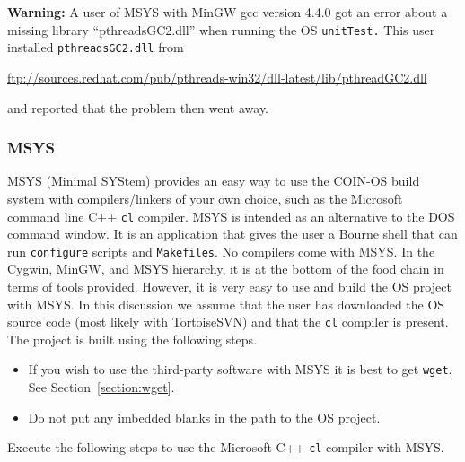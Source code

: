 \documentclass[11pt]{article}
\renewcommand{\_}{{\char"5F}}
\renewcommand{\{}{{\char"7B}}
\renewcommand{\}}{{\char"7D}}
\renewcommand{\^}{{\char"0D}}
\renewcommand{\'}{{\char"0D}}
\begin{document}
\vskip 8pt

{\bf Warning:} A user of  MSYS  with MinGW gcc version 4.4.0   got an error about a
missing library  ``pthreadsGC2.dll'' when running the OS {\tt unitTest.}  This user installed {\tt pthreadsGC2.dll} from
\begin{center}
 \url{ftp://sources.redhat.com/pub/pthreads-win32/dll-latest/lib/pthreadGC2.dll}
\end{center}
and reported that the problem then went away.


\subsubsection{MSYS} \label{section:msys}

%
MSYS (Minimal SYStem) provides an easy way to use the COIN-OS build system with compilers/linkers of your own choice,
such as the Microsoft command line C++ {\tt cl} compiler.  MSYS is intended as an alternative to the DOS command window.
It is an application that gives the user a Bourne shell that can run {\tt configure}  scripts and {\tt Makefiles}.
No compilers come with MSYS.
In the Cygwin, MinGW, and MSYS hierarchy, it is at the bottom of the food chain in terms of tools provided.
However, it is very easy to use and build the OS project with MSYS.    In this discussion we assume that the user
has downloaded the OS source code (most likely  with TortoiseSVN) 
and that the {\tt cl} compiler is present.
The project is built using the following steps.

\vskip 8pt


\begin{itemize}

\item If you wish to use the third-party software with MSYS it is best to get {\tt wget}.
See Section~\ref{section:wget}.

 \item Do not put any imbedded blanks in the path to the OS project.
\end{itemize}



Execute the following steps to use the Microsoft C++ {\tt cl} compiler with MSYS.
\end{document}
